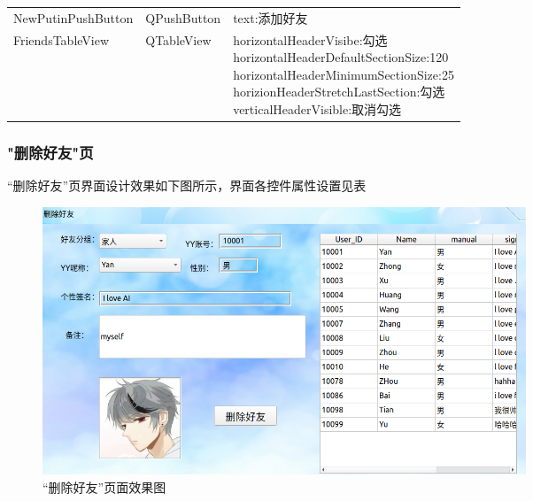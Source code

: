 \documentclass{progartcn}
\begin{document}
\begin{table}[H]
\begin{tabular}{lll}
		NewPutinPushButton   & QPushButton & text:添加好友                                                                                                                                                             \\
		FriendsTableView     & QTableView  & \makecell[l]{horizontalHeaderVisibe:勾选\\ horizontalHeaderDefaultSectionSize:120\\ horizontalHeaderMinimumSectionSize:25\\ horizionHeaderStretchLastSection:勾选\\ verticalHeaderVisible:取消勾选}
		\\
		\bottomrule[1.5pt]
	\end{tabular}
\end{table}

\subsubsection{"删除好友"页}

“删除好友”页界面设计效果如下图所示，界面各控件属性设置见表

\begin{figure}[H]
	\centering
	\includegraphics[width=0.7\textwidth]{7.png}
	\caption{\centering  “删除好友”页面效果图}
\end{figure}
\end{document}
